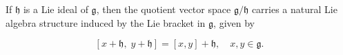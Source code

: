 If $\mathfrak{h}$ is a Lie ideal of $\mathfrak{g}$, then the quotient vector space $\mathfrak{g}/\mathfrak{h}$ carries a natural Lie algebra structure induced by the Lie bracket in $\mathfrak{g}$, given by

$$[x + \mathfrak{h}, \; y + \mathfrak{h}] = [x, y] + \mathfrak{h}, \quad x, y \in \mathfrak{g}.$$
